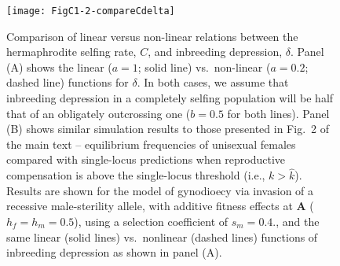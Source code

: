 \documentclass{article}
\begin{document}
\begin{figure}[ht!]
\centering
\texttt{[image: FigC1-2-compareCdelta]}
\caption{Comparison of linear versus non-linear relations between the hermaphrodite selfing rate, $C$, and inbreeding depression, $\delta$. Panel (A) shows the linear ($a=1$; solid line) vs.~non-linear ($a=0.2$; dashed line) functions for $\delta$. In both cases, we assume that inbreeding depression in a completely selfing population will be half that of an obligately outcrossing one ($b=0.5$ for both lines). Panel (B) shows similar simulation results to those presented in Fig.~2 of the main text -- equilibrium frequencies of unisexual females compared with single-locus predictions when reproductive compensation is above the single-locus threshold (i.e., $k > \hat{k}$). Results are shown for the model of gynodioecy via invasion of a recessive male-sterility allele, with additive fitness effects at $\mathbf{A}$ ($h_f = h_m = 0.5$), using a selection coefficient of $s_m = 0.4$., and the same linear (solid lines) vs.~nonlinear (dashed lines) functions of inbreeding depression as shown in panel (A).}
\label{fig:Cdelta}
\end{figure}



\clearpage


\end{document}
